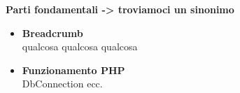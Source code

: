 \textbf{Parti fondamentali -> troviamoci un sinonimo} \\
\begin{itemize}
	\item \textbf{Breadcrumb}\\	qualcosa qualcosa qualcosa
	\item \textbf{Funzionamento PHP}\\	DbConnection ecc.
\end{itemize}